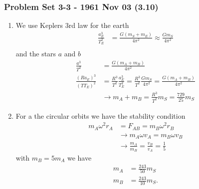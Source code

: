 \documentclass[10pt,a4paper]{book}
\theoremstyle{definition}
\begin{document}
\subsubsection{Problem Set 3-3 - 1961 Nov 03 (3.10)}
\begin{enumerate}[label=(\alph*)]
\item We use Keplers 3rd law for the earth
\begin{align}
    \frac{a_E^3}{T_E^2}&=\frac{G(m_S+m_E)}{4\pi^2}\approx\frac{Gm_S}{4\pi^2}\\
\end{align}
and the stars $a$ and $b$
\begin{align}
    \frac{a^3}{T^2}&=\frac{G(m_A+m_B)}{4\pi^2}\\
    \frac{(Ra_E)^3}{(TT_E)^2}&=\frac{R^3}{T^2}\frac{a_E^3}{T_E^2}=\frac{R^3}{T^2}\frac{Gm_S}{4\pi^2}=\frac{G(m_A+m_B)}{4\pi^2}\\
    &\rightarrow m_A+m_B = \frac{R^3}{T^2}m_S=\frac{729}{25}m_S
\end{align}

\item For a the circular orbits we have the stability condition
\begin{align}
    m_A\omega^2r_A&=F_{AB}=m_B\omega^2r_B\\
    &\rightarrow m_A\omega v_A=m_B\omega v_B\\
    &\rightarrow \frac{m_A}{m_B} =\frac{v_B}{v_A}=\frac{1}{5}
\end{align}
with $m_B=5m_A$ we have 
\begin{align}
    m_A&=\frac{243}{50}m_S\\
    m_B&=\frac{243}{10}m_S.
\end{align}
\end{enumerate}
\end{document}
